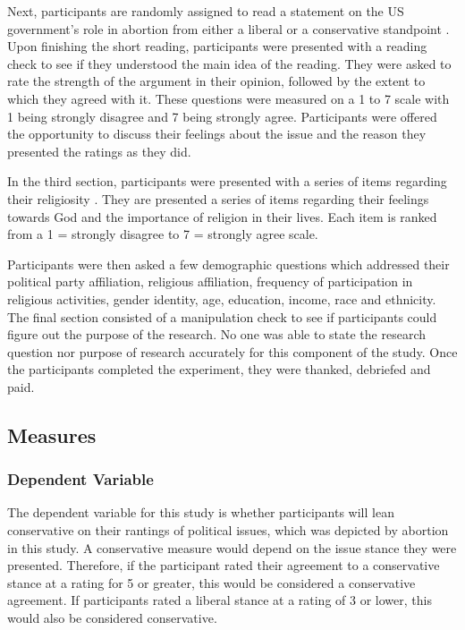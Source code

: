 \documentclass[letterpaper,man,natbib,noextraspace,12pt]{apa6}  %
\begin{document}
Next, participants are randomly assigned to read a statement on the US government’s role in abortion from either a liberal or a conservative standpoint \citep{suhay_role_2018}. Upon finishing the short reading, participants were presented with a reading check to see if they understood the main idea of the reading. They were asked to rate the strength of the argument in their opinion, followed by the extent to which they agreed with it. These questions were measured on a 1 to 7 scale with 1 being strongly disagree and 7 being strongly agree. Participants were offered the opportunity to discuss their feelings about the issue and the reason they presented the ratings as they did. 

In the third section, participants were presented with a series of items regarding their religiosity \citep{bakhti_religious_2018}. They are presented a series of items regarding their feelings towards God and the importance of religion in their lives. Each item is ranked from a 1 = strongly disagree to 7 = strongly agree scale. 

Participants were then asked a few demographic questions which addressed their political party affiliation, religious affiliation, frequency of participation in religious activities, gender identity, age, education, income, race and ethnicity. The final section consisted of a manipulation check to see if participants could figure out the purpose of the research. No one was able to state the research question nor purpose of research accurately for this component of the study. Once the participants completed the experiment, they were thanked, debriefed and paid. 

\subsection{Measures}

\subsubsection{Dependent Variable}

The dependent variable for this study is whether participants will lean conservative on their rantings of political issues, which was depicted by abortion in this study. A conservative measure would depend on the issue stance they were presented. Therefore, if the participant rated their agreement to a conservative stance at a rating for 5 or greater, this would be considered a conservative agreement. If participants rated a liberal stance at a rating of 3 or lower, this would also be considered conservative.
\end{document}
